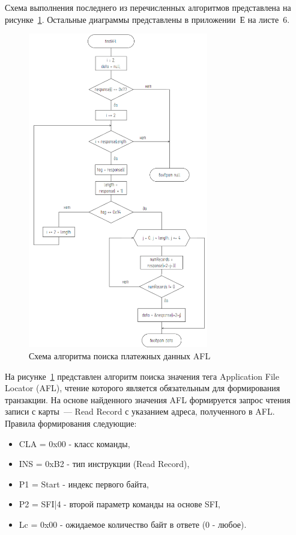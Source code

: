 Схема выполнения последнего из перечисленных алгоритмов представлена на рисунке~\ref{fig:find_afl}.
Остальные диаграммы представлены в приложении~Е на листе~6.

\begin{figure}[H]
    \centering
    \includegraphics[width=0.7\textwidth]{images/design/find_afl}
    \caption{\centering Схема алгоритма поиска платежных данных AFL}
    \label{fig:find_afl}
\end{figure}


На рисунке~\ref{fig:find_afl} представлен алгоритм поиска значения тега Application File Locator (AFL), чтение которого является обязательным для формирования транзакции.
На основе найденного значения AFL формируется запрос чтения записи с карты~--- Read Record с указанием адреса, полученного в AFL.
Правила формирования следующие:

\begin{itemize}
    \item CLA = 0x00  - класс команды,
    \item INS = 0xB2 - тип инструкции (Read Record),
    \item P1 = Start - индекс первого байта,
    \item P2 = SFI|4 - второй параметр команды на основе SFI,
    \item Lc = 0x00 - ожидаемое количество байт в ответе (0 - любое).
\end{itemize}

